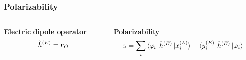 \begin{frame}
\frametitle{Polarizability}
\begin{columns}

\begin{column}[b]{0.3\textwidth}
\centering
\textbf{Electric dipole operator}
\begin{equation}
    \nonumber
    \hat{h}^{(E)} = \boldsymbol{r}_O
\end{equation}
\end{column}


\begin{column}[b]{0.7\textwidth}
\centering
\textbf{Polarizability}
\begin{equation}
    \nonumber
    \alpha 
    = \sum_i 
    \bra{\varphi_i}\hat{h}^{(E)} \ket{x_i^{(E)}} + 
    \bra{y_i^{(E)}}\hat{h}^{(E)}\ket{\varphi_i}
\end{equation}
\end{column}
\end{columns}

\vspace{5mm}



\end{frame}
